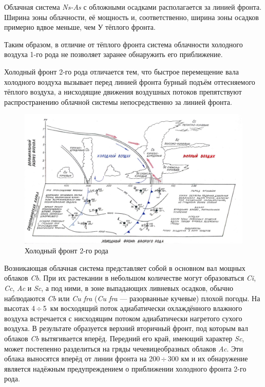 \documentclass[a4paper, 12pt, twoside, final, book, russian, fittopage, cyremdash, openright]{ncc}
\newcommand{\otdo}{\,\ensuremath{\div}\,}
\begin{document}
Облачная система \textit{Ns-As} с обложными осадками располагается за
линией фронта. Ширина зоны облачности, её мощность и, соответственно,
ширина зоны осадков примерно вдвое меньше, чем У тёплого фронта.

Таким образом, в отличие от тёплого фронта система облачности
холодного воздуха 1-го рода не позволяет заранее обнаружить его
приближение.

Холодный фронт 2-го рода отличается тем, что быстрое перемещение вала
холодного воздуха вызывает перед линией фронта бурный подъём
оттесняемого тёплого воздуха, а нисходящие движения воздушных потоков
препятствуют распространению облачной системы непосредственно за
линией фронта.

\begin{figure}[htb]
   \centering
   \includegraphics[scale=0.7]{08_cold_front_2.pdf}
   \caption{Холодный фронт 2-го рода}
   \label{fig:08_cold_front_2}
\end{figure}

Возникающая облачная система представляет собой в основном вал мощных
облаков \textit{Cb}. При их растекании в небольшом количестве могут
образоваться \textit{Ci}, \textit{Cc}, \textit{Ac} и \textit{Sc}, а
под ними, в зоне выпадающих ливневых осадков, обычно наблюдаются
\textit{Cb} или \textit{Cu fra} (\textit{Cu fra} — разорванные
кучевые) плохой погоды.  На высотах 4\otdo{}5~км восходящий поток
адиабатически охлаждённого влажного воздуха встречается с нисходящим
потоком адиабатически нагретого сухого воздуха. В результате
образуется верхний вторичный фронт, под которым вал облаков
\textit{Cb} вытягивается вперёд. Передний его край, имеющий характер
\textit{Sc}, может постепенно разделиться на гряды чечевицеобразных
облаков \textit{Ac}. Эти облака выносятся вперёд от линии фронта на
200\otdo{}300 км и их обнаружение является надёжным предупреждением о
приближении холодного фронта 2-го рода.
\end{document}
